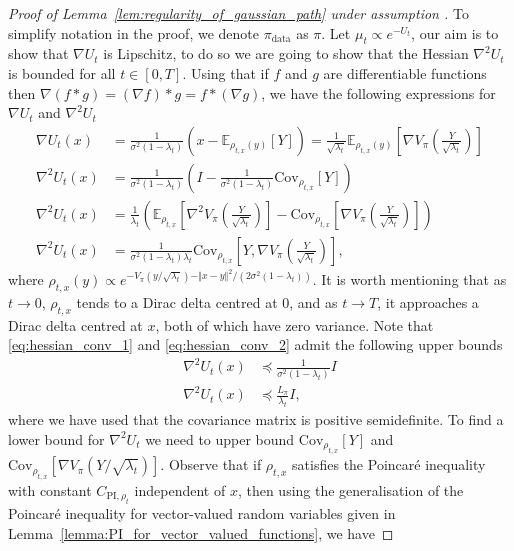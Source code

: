 \begin{proof}[Proof of Lemma~\ref{lem:regularity_of_gaussian_path} under assumption ]
To simplify notation in the proof, we denote $\pi_{\text{data}}$ as $\pi$.
    Let $\mu_t\propto e^{-U_t}$, our aim is to show that $\nabla U_t$ is Lipschitz, to do so we are going to show that the Hessian $\nabla^2 U_t$ is bounded for all $t\in[0, T]$. 
    Using that if $f$ and $g$ are differentiable functions then $\nabla(f*g) = (\nabla f)* g = f * (\nabla g)$, we have the following expressions for $\nabla U_t$ and $\nabla^2 U_t$
\begin{align}
    \nabla U_t(x) &= \frac{1}{\sigma^2(1-\lambda_t)}\left(x-\mathbb{E}_{\rho_{t, x}(y)}\left[Y\right]\right) = \frac{1}{\sqrt{\lambda_t}}\mathbb{E}_{\rho_{t, x}(y)}\left[\nabla V_{\pi}\left(\frac{Y}{\sqrt{\lambda_t}}\right)\right]\label{eq:score_conv_expressions} \\
\nabla^2 U_t(x) &=\frac{1}{\sigma^2(1-\lambda_t)}\left(I - \frac{1}{\sigma^2(1-\lambda_t)}\text{Cov}_{\rho_{t, x}}\left[Y\right]\right)\label{eq:hessian_conv_1}\\
\nabla^2 U_t(x) &=\frac{1}{\lambda_t}\left(\mathbb{E}_{\rho_{t, x}}\left[\nabla^2 V_\pi\left(\frac{Y}{\sqrt{\lambda_t}}\right)\right] - \text{Cov}_{\rho_{t, x}}\left[\nabla V_\pi\left(\frac{Y}{\sqrt{\lambda_t}}\right)\right]\right)\label{eq:hessian_conv_2}\\
    \nabla^2 U_t(x) &=\frac{1}{\sigma^2(1-\lambda_t)\lambda_t}\text{Cov}_{\rho_{t, x}}\left[Y, \nabla V_\pi\left(\frac{Y}{\sqrt{\lambda_t}}\right)\right],\label{eq:hessian_conv_3}
\end{align}
where $\rho_{t, x}(y)\propto e^{-V_\pi(y/\sqrt{\lambda_t})-\Vert x-y\Vert^2/(2\sigma^2(1-\lambda_t))}$.
It is worth mentioning that as $t\to 0$, $\rho_{t, x}$ tends to a Dirac delta centred at $0$, and as $t\to T$, it approaches a Dirac delta centred at $x$, both of which have zero variance.
Note that \eqref{eq:hessian_conv_1} and \eqref{eq:hessian_conv_2} admit the following upper bounds
\begin{align}
    \nabla^2 U_t(x) &\preccurlyeq\frac{1}{\sigma^2(1-\lambda_t)}I \label{eq:hessian_upper_bound_1}\\
\nabla^2 U_t(x) &\preccurlyeq\frac{L_\pi}{\lambda_t} I,\label{eq:hessian_upper_bound_2}
\end{align}
where we have used that the covariance matrix is positive semidefinite.
To find a lower bound for $\nabla^2 U_t$ we need to upper bound $\text{Cov}_{\rho_{t, x}}\left[Y\right]$ and $\text{Cov}_{\rho_{t, x}}\left[\nabla V_\pi(Y/\sqrt{\lambda_t})\right]$. Observe that if $\rho_{t, x}$ satisfies the Poincaré inequality with constant $C_{\text{PI}, \rho_{t}}$ independent of $x$, then using the generalisation of the Poincaré inequality for vector-valued random variables given in Lemma~\ref{lemma:PI_for_vector_valued_functions}, we have

\end{proof}
